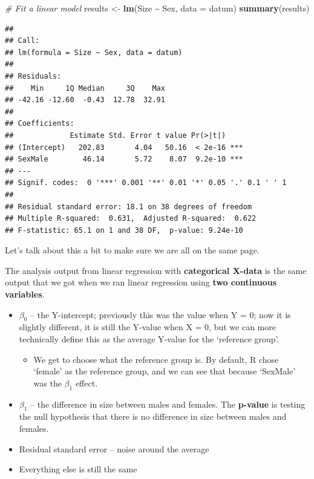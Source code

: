 \documentclass[
]{article}
\newenvironment{Shaded}{\begin{snugshade}}{\end{snugshade}}
\newcommand{\AttributeTok}[1]{\textcolor[rgb]{0.13,0.29,0.53}{#1}}
\newcommand{\CommentTok}[1]{\textcolor[rgb]{0.56,0.35,0.01}{\textit{#1}}}
\newcommand{\FunctionTok}[1]{\textcolor[rgb]{0.13,0.29,0.53}{\textbf{#1}}}
\newcommand{\NormalTok}[1]{#1}
\newcommand{\OtherTok}[1]{\textcolor[rgb]{0.56,0.35,0.01}{#1}}
\newcommand{\SpecialCharTok}[1]{\textcolor[rgb]{0.81,0.36,0.00}{\textbf{#1}}}
\providecommand{\tightlist}{%
  \setlength{\itemsep}{0pt}\setlength{\parskip}{0pt}}
\begin{document}
\begin{Shaded}
\begin{Highlighting}[]
\CommentTok{\# Fit a linear model}
\NormalTok{results }\OtherTok{\textless{}{-}} \FunctionTok{lm}\NormalTok{(Size }\SpecialCharTok{\textasciitilde{}}\NormalTok{ Sex, }\AttributeTok{data =}\NormalTok{ datum)}
\FunctionTok{summary}\NormalTok{(results)}
\end{Highlighting}
\end{Shaded}

\begin{verbatim}
## 
## Call:
## lm(formula = Size ~ Sex, data = datum)
## 
## Residuals:
##    Min     1Q Median     3Q    Max 
## -42.16 -12.60  -0.43  12.78  32.91 
## 
## Coefficients:
##             Estimate Std. Error t value Pr(>|t|)    
## (Intercept)   202.83       4.04   50.16  < 2e-16 ***
## SexMale        46.14       5.72    8.07  9.2e-10 ***
## ---
## Signif. codes:  0 '***' 0.001 '**' 0.01 '*' 0.05 '.' 0.1 ' ' 1
## 
## Residual standard error: 18.1 on 38 degrees of freedom
## Multiple R-squared:  0.631,  Adjusted R-squared:  0.622 
## F-statistic: 65.1 on 1 and 38 DF,  p-value: 9.24e-10
\end{verbatim}

Let's talk about this a bit to make sure we are all on the same page.

The analysis output from linear regression with \textbf{categorical
X-data} is the same output that we got when we ran linear regression
using \textbf{two continuous variables}.

\begin{itemize}
\tightlist
\item
  \(\beta_0\) -- the Y-intercept; previously this was the value when Y =
  0; now it is slightly different, it is still the Y-value when X = 0,
  but we can more technically define this as the average Y-value for the
  `reference group'.

  \begin{itemize}
  \tightlist
  \item
    We get to choose what the reference group is. By default, R chose
    `female' as the reference group, and we can see that because
    `SexMale' was the \(\beta_1\) effect.
  \end{itemize}
\item
  \(\beta_1\) -- the difference in size between males and females. The
  \textbf{p-value} is testing the null hypothesis that there is no
  difference in size between males and females.
\item
  Residual standard error -- noise around the average
\item
  Everything else is still the same
\end{itemize}
\end{document}
